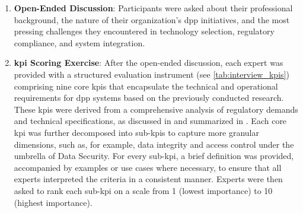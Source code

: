 \begin{enumerate}[itemsep=0.5\baselineskip]
    \item \textbf{Open-Ended Discussion}: Participants were asked about their professional background, the nature of their organization’s \ac{dpp} initiatives, and the most pressing challenges they encountered in technology selection, regulatory compliance, and system integration.

    \item \textbf{\ac{kpi} Scoring Exercise}: After the open-ended discussion, each expert was provided with a structured evaluation instrument (see \cref{tab:interview_kpis}) comprising nine core \ac{kpi}s that encapsulate the technical and operational requirements for \ac{dpp} systems based on the previously conducted research. These \ac{kpi}s were derived from a comprehensive analysis of regulatory demands and technical specifications, as discussed in  and summarized in . Each core \ac{kpi} was further decomposed into sub-\ac{kpi}s to capture more granular dimensions, such as, for example, data integrity and access control under the umbrella of Data Security. For every sub-\ac{kpi}, a brief definition was provided, accompanied by examples or use cases where necessary, to ensure that all experts interpreted the criteria in a consistent manner. Experts were then asked to rank each sub-\ac{kpi} on a scale from 1 (lowest importance) to 10 (highest importance).
\end{enumerate}


